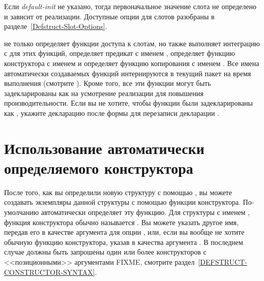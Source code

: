 \begin{defmac}
Если \emph{default-init} не указано, тогда первоначальное значение слота не
определено и зависит от реализации. Доступные опции для слотов разобраны в
разделе~\ref{Defstruct-Slot-Options}.

 не только определяет функции доступа к слотам, но также
выполняет интеграцию с  для этих функций, определяет предикат с
именем , определяет функцию конструктора с именем
 и определяет функцию копирования с именем
.
Все имена автоматически создаваемых функций интернируются в текущий пакет на время
выполнения  (смотрите ).
Кроме того, все эти функции могут быть задекларированы как  на
усмотрение реализации для повышения производительности.
Если вы не хотите, чтобы функции были задекларированы как , укажите
декларацию  после формы  для перезаписи декларации
.
\end{defmac}

\section{Использование автоматически определяемого конструктора}

После того, как вы определили новую структуру с помощью , вы
можете создавать экземпляры данной структуры с помощью функции конструктора.
По-умолчанию  автоматически определяет эту функцию.
Для структуры с именем , функция конструктора обычно называется
.
Вы можете указать другое имя, передав его в качестве аргумента для опции
, или, если вы вообще не хотите обычную функцию
конструктора, указав в качества аргумента {\false}. 
В последнем случае должны быть запрошены один или более конструкторов
с <<позиционными>> аргументами FIXME, смотрите раздел~\ref{DEFSTRUCT-CONSTRUCTOR-SYNTAX}.

